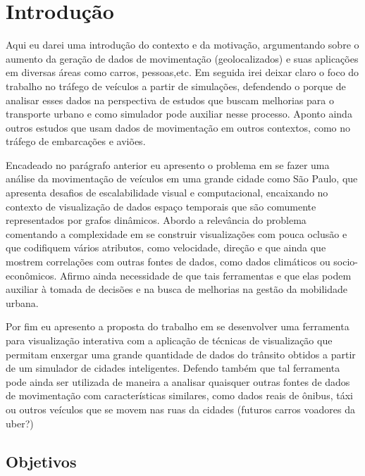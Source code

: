 \chapter{Introdução}
\label{cap:introducao}

Aqui eu darei uma introdução do contexto e da motivação, argumentando sobre o aumento da geração de dados de
movimentação (geolocalizados) e suas aplicações em diversas áreas como carros,
pessoas,etc. Em seguida irei deixar claro o foco do trabalho no tráfego de veículos a
partir de simulações, defendendo o porque de analisar esses dados na
perspectiva de estudos que buscam melhorias para o transporte urbano e como simulador
pode auxiliar nesse processo. Aponto ainda outros estudos que usam dados de
movimentação em outros contextos, como no tráfego de embarcações e aviões.

Encadeado no parágrafo anterior eu apresento o problema em se fazer
uma análise da movimentação de veículos em uma grande cidade como São Paulo, que apresenta
desafios de escalabilidade visual e computacional, encaixando no contexto de visualização de dados
espaço temporais que são comumente representados por grafos dinâmicos. Abordo a relevância
do problema comentando a complexidade em se construir visualizações com pouca oclusão
e que codifiquem vários atributos, como velocidade, direção e que ainda que mostrem
correlações com outras fontes de dados, como dados climáticos ou socio-econômicos. 
Afirmo ainda  necessidade de que tais ferramentas e que elas podem auxiliar à tomada
de decisões e na busca de melhorias na gestão da mobilidade urbana.

Por fim eu apresento a proposta do trabalho em se
desenvolver uma ferramenta para visualização interativa com a aplicação de técnicas de
visualização que permitam enxergar uma grande quantidade de dados do trânsito
obtidos a partir de um simulador de cidades inteligentes. Defendo também que tal
ferramenta pode ainda ser utilizada de maneira a analisar quaisquer outras fontes
de dados de movimentação com características similares, como dados
reais de ônibus, táxi ou outros veículos que se movem nas ruas da cidades 
(futuros carros voadores da uber?)

\section{Objetivos}
\label{sec:objetivos}

